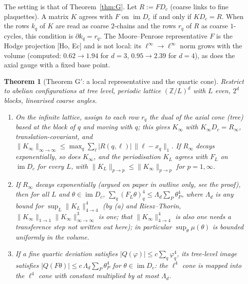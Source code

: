 \documentclass[11pt,a4paper]{article}
\newtheorem{theorem}{Theorem}[section]
\theoremstyle{definition}
\theoremstyle{remark}
\newcommand{\im}{\operatorname{im}}
\begin{document}
The setting is that of Theorem~\ref{thm:G}. Let $R:=FD_c$ (coarse links to fine plaquettes). A matrix $K$ agrees with $F$ on $\im D_c$ if and only if $KD_c=R$. When the rows $k_q$ of $K$ are read as coarse $2$-chains and the rows $r_q$ of $R$ as coarse $1$-cycles, this condition is $\partial k_q=r_q$. The Moore--Penrose representative $F$ is the Hodge projection [Ho, Ec] and is not local: its $\ell^\infty\to\ell^\infty$ norm grows with the volume (computed: $0.62\to1.94$ for $d=3$, $0.95\to2.39$ for $d=4$), as does the axial gauge with a fixed base point.

\begin{theorem}[Theorem G$'$: a local representative and the quartic cone]\label{thm:Gp}
Restrict to abelian configurations at tree level, periodic lattice $(\mathbb{Z}/L)^d$ with $L$ even, $2^d$ blocks, linearised coarse angles.
\begin{enumerate}[label=(\alph*)]
\item On the infinite lattice, assign to each row $r_q$ the dual of the axial cone (tree) based at the block of $q$ and moving with $q$; this gives $K_\infty$ with $K_\infty D_c=R_\infty$, translation-covariant, and $\|K_\infty\|_{\infty\to\infty}\le\max_q\sum_\ell|R(q,\ell)|\,\|\ell-x_q\|_1$. If $R_\infty$ decays exponentially, so does $K_\infty$, and the periodisation $K_L$ agrees with $F_L$ on $\im D_c$ for every $L$, with $\|K_L\|_{p\to p}\le\|K_\infty\|_{p\to p}$ for $p=1,\infty$.
\item If $R_\infty$ decays exponentially \textup{(}argued on paper in outline only, see the proof\textup{)}, then for all $L$ and $\theta\in\im D_c$, $\sum_q(F_L\theta)_q^4\le\Lambda_d\sum_P\theta_P^4$, where $\Lambda_d$ is any bound for $\sup_L\|K_L\|_{4\to4}^4$ \textup{(}by \textup{(a)} and Riesz--Thorin, $\|K_\infty\|_{1\to1}\|K_\infty\|_{\infty\to\infty}^3$ is one; that $\|K_\infty\|_{4\to4}^4$ is also one needs a transference step not written out here\textup{)}; in particular $\sup_\theta\mu(\theta)$ is bounded uniformly in the volume.
\item If a fine quartic deviation satisfies $|Q(\varphi)|\le c\sum_q\varphi_q^4$, its tree-level image satisfies $|Q(F\theta)|\le c\,\Lambda_d\sum_P\theta_P^4$ for $\theta\in\im D_c$: the $\ell^4$ cone is mapped into the $\ell^4$ cone with constant multiplied by at most $\Lambda_d$.
\end{enumerate}
\end{theorem}
\end{document}
